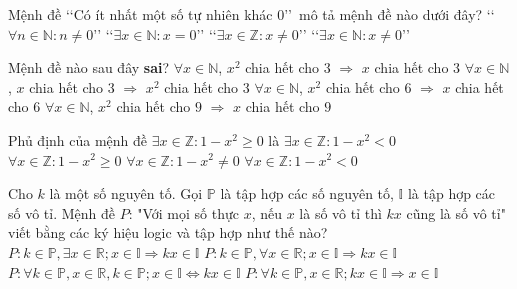 \begin{ex}%
	Mệnh đề \lq\lq Có ít nhất một số tự nhiên khác $0$\rq\rq\ mô tả  mệnh đề nào dưới đây?
	 \choice
		{\lq\lq$\forall n \in \mathbb{N}: n \neq  0$\rq\rq}
		{\lq\lq$\exists x \in \mathbb{N}:  x=0$\rq\rq}
		{\lq\lq$\exists x \in \mathbb{Z}:  x \neq 0$\rq\rq}
		{\True \lq\lq$\exists  x \in \mathbb{N}: x \neq 0$\rq\rq}
\end{ex}

\begin{ex}%
	Mệnh  đề nào sau đây {\bf sai}?
	 \choice
		{$\forall x\in\mathbb{N}$, $x^2$ chia hết  cho $3$ $\Rightarrow$ $x$ chia hết cho $3$}
		{$\forall x\in\mathbb{N}$, $x$ chia hết cho $3$  $\Rightarrow$ $x^2$ chia hết cho $3$}
		{$\forall x\in\mathbb{N}$, $x^2$ chia hết cho $6$ $\Rightarrow$ $x$ chia hết cho $6$} 
		{\True $\forall x\in\mathbb{N}$, $x^2$  chia hết cho $9$ $\Rightarrow$ $x$ chia hết cho $9$}
\end{ex}

\begin{ex}%
	Phủ định của mệnh đề $\exists x\in\mathbb{Z}\colon 1-x^2\geq 0$ là 
	 \choice
		{$\exists  x\in\mathbb{Z}\colon 1-x^2< 0$}
		 {$\forall x\in\mathbb{Z}\colon 1-x^2\geq 0$}
		{$\forall  x\in\mathbb{Z}\colon 1-x^2\neq 0$}
		 {\True $\forall x\in\mathbb{Z}\colon 1-x^2<0$}
\end{ex}

\begin{ex}%
	Cho $k$ là một số  nguyên tố. Gọi $\mathbb{P}$ là tập hợp các số nguyên tố, $\mathbb{I}$ là tập hợp các số vô tỉ. Mệnh đề $P$: "Với mọi số thực $x$, nếu $x$ là số vô tỉ thì $kx$ cũng là số vô tỉ" viết bằng các ký hiệu logic và tập hợp như thế nào?
	 \choice
		 {$P\colon k\in\mathbb{P}, \exists x\in\mathbb{R}; x\in\mathbb{I}\Rightarrow kx\in\mathbb{I}$}
		{\True $P\colon k\in\mathbb{P}, \forall x\in\mathbb{R};  x\in\mathbb{I}\Rightarrow kx\in\mathbb{I}$}
		{$P\colon \forall k\in\mathbb{P}, x\in\mathbb{R}, k\in\mathbb{P}; x\in\mathbb{I}\Leftrightarrow kx\in\mathbb{I}$} 
		 {$P\colon \forall k\in\mathbb{P}, x\in\mathbb{R}; kx\in\mathbb{I}\Rightarrow x\in\mathbb{I}$}
\end{ex}

